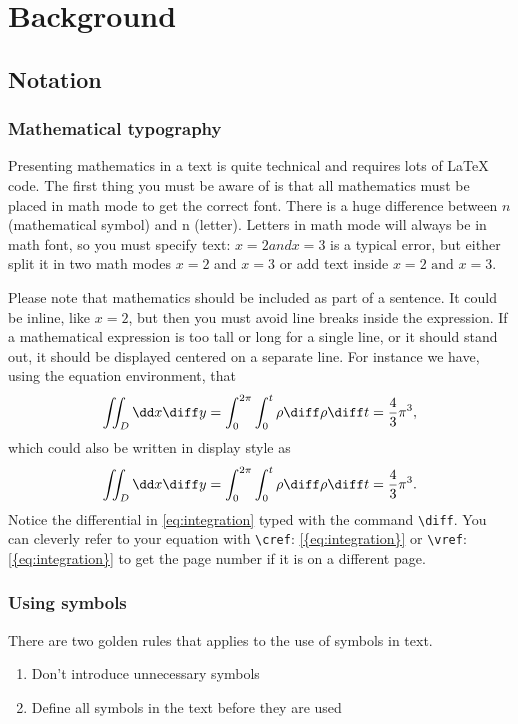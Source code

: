 \chapter{Background}
\label{background}

\section{Notation}
\subsection{Mathematical typography}
Presenting mathematics in a text is quite technical and requires lots of \LaTeX\; code. The first thing you must be aware of is that all mathematics must be placed in math mode to get the correct font. There is a huge difference between $n$ (mathematical symbol) and n (letter). Letters in math mode will always be in math font, so you must specify text: $x=2 and x=3$ is a typical error, but either split it in two math modes $x=2$ and $x=3$ or add text inside $x=2 \text{ and } x=3$. 

Please note that mathematics should be included as part of a sentence. It could be inline, like $x=2$, but then you must avoid line breaks inside the expression. If a mathematical expression is too tall or long for a single line, or it should stand out, it should be displayed centered on a separate line. For instance we have, using the equation environment, that
\begin{equation*}
    \iint_D \dd x \diff y
    =
    \int_0^{2\pi} \int_0^t \rho \diff \rho \diff t
    =
    \frac{4}{3} \pi^3,
    \label{eq:integration}
\end{equation*}
which could also be written in display style as 
\[\iint_D \dd x \diff y
    =
    \int_0^{2\pi} \int_0^t \rho \diff \rho \diff t
    =
    \frac{4}{3} \pi^3.\]
Notice the differential in \cref{eq:integration} typed with the command \texttt{\textbackslash diff}. You can cleverly refer to your equation with \texttt{\textbackslash cref}: \cref{{eq:integration}} or \texttt{\textbackslash vref}: \vref{{eq:integration}} to get the page number if it is on a different page.

\subsection{Using symbols}
 There are two golden rules that applies to the use of symbols in text.
\begin{enumerate}
    \item Don’t introduce unnecessary symbols
    \item Define all symbols in the text before they are used
\end{enumerate}

